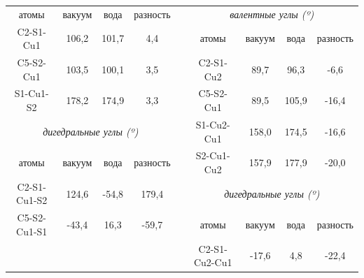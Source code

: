 \documentclass[a4paper,12pt]{article}
\begin{document}
\begin{onehalfspace}
\begin{table}[H]
\begin{tabular}{ccccc|cccc|}
			\multicolumn{1}{|c|}{атомы}        & \multicolumn{1}{c|}{вакуум} & \multicolumn{1}{c|}{вода}  & \multicolumn{1}{c|}{разность} &           & \multicolumn{4}{c|}{\textit{валентные углы (º)}}                                                          \\ \cline{1-4} \cline{6-9} 
			\multicolumn{1}{|c|}{C2-S1-Cu1}    & \multicolumn{1}{c|}{106,2}  & \multicolumn{1}{c|}{101,7} & \multicolumn{1}{c|}{4,4}      &           & \multicolumn{1}{c|}{атомы}         & \multicolumn{1}{c|}{вакуум} & \multicolumn{1}{c|}{вода}   & разность \\ \cline{1-4} \cline{6-9} 
			\multicolumn{1}{|c|}{C5-S2-Cu1}    & \multicolumn{1}{c|}{103,5}  & \multicolumn{1}{c|}{100,1} & \multicolumn{1}{c|}{3,5}      &           & \multicolumn{1}{c|}{C2-S1-Cu2}     & \multicolumn{1}{c|}{89,7}   & \multicolumn{1}{c|}{96,3}   & -6,6     \\ \cline{1-4} \cline{6-9} 
			\multicolumn{1}{|c|}{S1-Cu1-S2}    & \multicolumn{1}{c|}{178,2}  & \multicolumn{1}{c|}{174,9} & \multicolumn{1}{c|}{3,3}      &           & \multicolumn{1}{c|}{C5-S2-Cu1}     & \multicolumn{1}{c|}{89,5}   & \multicolumn{1}{c|}{105,9}  & -16,4    \\ \cline{1-4} \cline{6-9} 
			\multicolumn{4}{|c|}{\textit{дигедральные углы   (º)}}                                                                        & \textit{} & \multicolumn{1}{c|}{S1-Cu2-Cu1}    & \multicolumn{1}{c|}{158,0}  & \multicolumn{1}{c|}{174,5}  & -16,6    \\ \cline{1-4} \cline{6-9} 
			\multicolumn{1}{|c|}{атомы}        & \multicolumn{1}{c|}{вакуум} & \multicolumn{1}{c|}{вода}  & \multicolumn{1}{c|}{разность} &           & \multicolumn{1}{c|}{S2-Cu1-Cu2}    & \multicolumn{1}{c|}{157,9}  & \multicolumn{1}{c|}{177,9}  & -20,0    \\ \cline{1-4} \cline{6-9} 
			\multicolumn{1}{|c|}{C2-S1-Cu1-S2} & \multicolumn{1}{c|}{124,6}  & \multicolumn{1}{c|}{-54,8} & \multicolumn{1}{c|}{179,4}    &           & \multicolumn{4}{c|}{\textit{дигедральные углы (º)}}                                                       \\ \cline{1-4} \cline{6-9} 
			\multicolumn{1}{|c|}{C5-S2-Cu1-S1} & \multicolumn{1}{c|}{-43,4}  & \multicolumn{1}{c|}{16,3}  & \multicolumn{1}{c|}{-59,7}    &           & \multicolumn{1}{c|}{атомы}         & \multicolumn{1}{c|}{вакуум} & \multicolumn{1}{c|}{вода}   & разность \\ \cline{1-4} \cline{6-9} 
			&                             &                            &                               &           & \multicolumn{1}{c|}{C2-S1-Cu2-Cu1} & \multicolumn{1}{c|}{-17,6}  & \multicolumn{1}{c|}{4,8}    & -22,4    \\ \cline{6-9} 

\end{tabular}
\end{table}
\end{onehalfspace}
\end{document}
